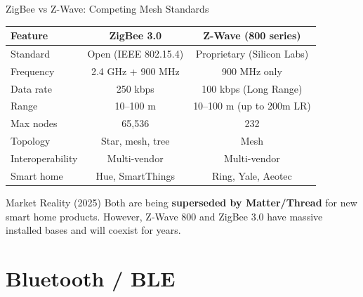 \documentclass[aspectratio=169,11pt]{beamer}
\begin{document}
\begin{frame}{ZigBee vs Z-Wave: Competing Mesh Standards}
    \begin{center}
    \begin{tabular}{lcc}
        \toprule
        \textbf{Feature} & \textbf{ZigBee 3.0} & \textbf{Z-Wave (800 series)} \\
        \midrule
        Standard & Open (IEEE 802.15.4) & Proprietary (Silicon Labs) \\
        Frequency & 2.4 GHz + 900 MHz & 900 MHz only \\
        Data rate & 250 kbps & 100 kbps (Long Range) \\
        Range & 10--100 m & 10--100 m (up to 200m LR) \\
        Max nodes & 65,536 & 232 \\
        Topology & Star, mesh, tree & Mesh \\
        Interoperability & Multi-vendor & Multi-vendor \\
        Smart home & Hue, SmartThings & Ring, Yale, Aeotec \\
        \bottomrule
    \end{tabular}
    \end{center}
    
    \vspace{0.3cm}
    \begin{alertblock}{Market Reality (2025)}
        Both are being \textbf{superseded by Matter/Thread} for new smart home products. However, Z-Wave 800 and ZigBee 3.0 have massive installed bases and will coexist for years.
    \end{alertblock}
\end{frame}

\section{Bluetooth / BLE}
\end{document}

